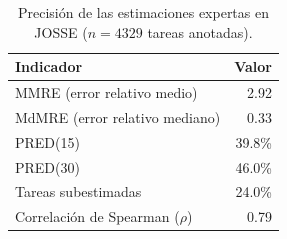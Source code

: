 \begin{table}[t]
\centering
\caption{Precisi\'on de las estimaciones expertas en JOSSE ($n=4329$ tareas anotadas).}
\label{tab:expertos}
\small
\begin{tabular}{lr}
\toprule
Indicador & Valor \\
\midrule
MMRE (error relativo medio) & 2.92 \\
MdMRE (error relativo mediano) & 0.33 \\
PRED(15) & 39.8\% \\
PRED(30) & 46.0\% \\
Tareas subestimadas & 24.0\% \\
Correlaci\'on de Spearman ($\rho$) & 0.79 \\
\bottomrule
\end{tabular}
\end{table}
